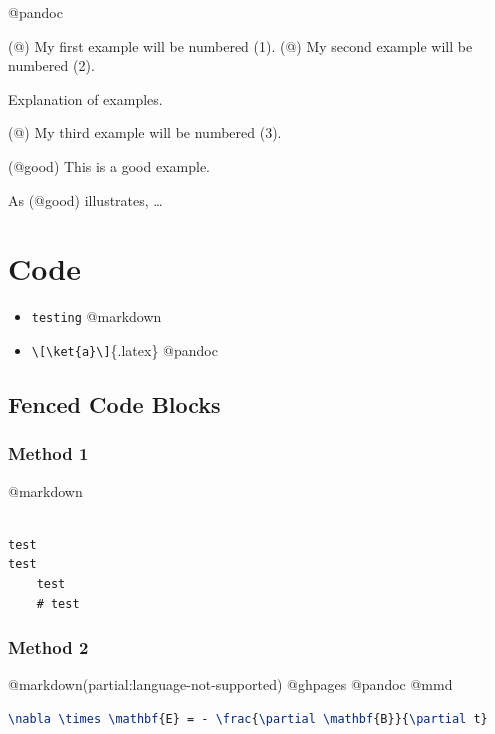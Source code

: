 @pandoc

(@) My first example will be numbered (1).
(@) My second example will be numbered (2).

Explanation of examples.

(@) My third example will be numbered (3).

(@good) This is a good example.

As (@good) illustrates, {\ldots}

\section{Code}
\label{code}

\begin{itemize}
\item \texttt{testing} @markdown

\item \texttt{\textbackslash{}[\textbackslash{}ket\{a\}\textbackslash{}]}\{.latex\} @pandoc

\end{itemize}

\subsection{Fenced Code Blocks}
\label{fencedcodeblocks}

\subsubsection{Method 1}
\label{method1}

@markdown

\begin{adjustwidth}{2.5em}{2.5em}
\begin{verbatim}

test
test
    test
    # test

\end{verbatim}
\end{adjustwidth}

\subsubsection{Method 2}
\label{method2}

@markdown(partial:language-not-supported) @ghpages @pandoc @mmd

\begin{adjustwidth}{2.5em}{2.5em}
\begin{lstlisting}[language=tex]
\nabla \times \mathbf{E} = - \frac{\partial \mathbf{B}}{\partial t}

\end{lstlisting}
\end{adjustwidth}

